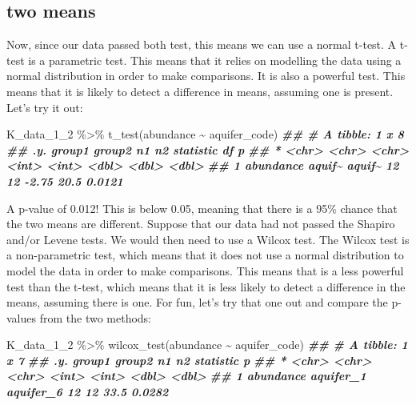 \documentclass[
]{krantz}
\newenvironment{Shaded}{\begin{snugshade}}{\end{snugshade}}
\newcommand{\DocumentationTok}[1]{\textcolor[rgb]{0.56,0.35,0.01}{\textbf{\textit{#1}}}}
\newcommand{\FunctionTok}[1]{\textcolor[rgb]{0.00,0.00,0.00}{#1}}
\newcommand{\NormalTok}[1]{#1}
\newcommand{\SpecialCharTok}[1]{\textcolor[rgb]{0.00,0.00,0.00}{#1}}
\begin{document}
\hypertarget{two-means}{%
\subsection{two means}\label{two-means}}

Now, since our data passed both test, this means we can use a normal t-test. A t-test is a parametric test. This means that it relies on modelling the data using a normal distribution in order to make comparisons. It is also a powerful test. This means that it is likely to detect a difference in means, assuming one is present. Let's try it out:

\begin{Shaded}
\begin{Highlighting}[]
\NormalTok{K\_data\_1\_2 }\SpecialCharTok{\%\textgreater{}\%}
  \FunctionTok{t\_test}\NormalTok{(abundance }\SpecialCharTok{\textasciitilde{}}\NormalTok{ aquifer\_code)}
\DocumentationTok{\#\# \# A tibble: 1 x 8}
\DocumentationTok{\#\#   .y.       group1 group2    n1    n2 statistic    df      p}
\DocumentationTok{\#\# * \textless{}chr\textgreater{}     \textless{}chr\textgreater{}  \textless{}chr\textgreater{}  \textless{}int\textgreater{} \textless{}int\textgreater{}     \textless{}dbl\textgreater{} \textless{}dbl\textgreater{}  \textless{}dbl\textgreater{}}
\DocumentationTok{\#\# 1 abundance aquif\textasciitilde{} aquif\textasciitilde{}    12    12     {-}2.75  20.5 0.0121}
\end{Highlighting}
\end{Shaded}

A p-value of 0.012! This is below 0.05, meaning that there is a 95\% chance that the two means are different. Suppose that our data had not passed the Shapiro and/or Levene tests. We would then need to use a Wilcox test. The Wilcox test is a non-parametric test, which means that it does not use a normal distribution to model the data in order to make comparisons. This means that is a less powerful test than the t-test, which means that it is less likely to detect a difference in the means, assuming there is one. For fun, let's try that one out and compare the p-values from the two methods:

\begin{Shaded}
\begin{Highlighting}[]
\NormalTok{K\_data\_1\_2 }\SpecialCharTok{\%\textgreater{}\%}
  \FunctionTok{wilcox\_test}\NormalTok{(abundance }\SpecialCharTok{\textasciitilde{}}\NormalTok{ aquifer\_code)}
\DocumentationTok{\#\# \# A tibble: 1 x 7}
\DocumentationTok{\#\#   .y.       group1    group2       n1    n2 statistic      p}
\DocumentationTok{\#\# * \textless{}chr\textgreater{}     \textless{}chr\textgreater{}     \textless{}chr\textgreater{}     \textless{}int\textgreater{} \textless{}int\textgreater{}     \textless{}dbl\textgreater{}  \textless{}dbl\textgreater{}}
\DocumentationTok{\#\# 1 abundance aquifer\_1 aquifer\_6    12    12      33.5 0.0282}
\end{Highlighting}
\end{Shaded}
\end{document}

